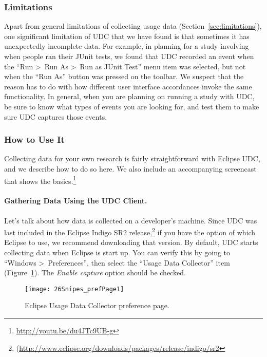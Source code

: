 \subsubsection{Limitations}

Apart from general limitations of collecting usage data (Section~\ref{sec:limitations}),
one significant limitation of UDC that we have found is that sometimes it has
unexpectedly incomplete data.
For example, in planning for a study involving when people ran their JUnit tests,
we found that UDC recorded an event when the ``Run \textgreater~Run As \textgreater~Run as JUnit Test'' menu item was selected,
but not when the ``Run As'' button was pressed on the toolbar.
We suspect that the reason has to do with how different user interface accordances
invoke the same functionality.
In general, when you are planning on running a study with UDC, be sure to know what
types of events you are looking for, and test them to make sure UDC captures those events.

\subsubsection{How to Use It}

\label{SecUDCHowToUseIt}

Collecting data for your own research is fairly straightforward with Eclipse UDC,
and we describe how to do so here.
We also include an accompanying screencast that shows the
basics.\footnote{\url{http://youtu.be/du4JTc9UB-g}}

\paragraph{Gathering Data Using the UDC Client.}

Let's talk about how data is collected on a developer's machine.
Since UDC was last included in the Eclipse Indigo SR2
release,\footnote{(\url{http://www.eclipse.org/downloads/packages/release/indigo/sr2}}
if you have the option of which Eclipse to use, we recommend downloading
that version.
By default, UDC starts collecting data when Eclipse is start up.
You can verify this by going to ``Windows \textgreater~Preferences'', then
select the ``Usage Data Collector'' item (Figure~\ref{fig:prefPage1}).
The \textit{Enable capture} option should be checked.

\begin{figure}
  \centering
  \texttt{[image: 26Snipes\_prefPage1]}
  \caption{Eclipse Usage Data Collector preference page.}\label{fig:prefPage1}
\end{figure}

